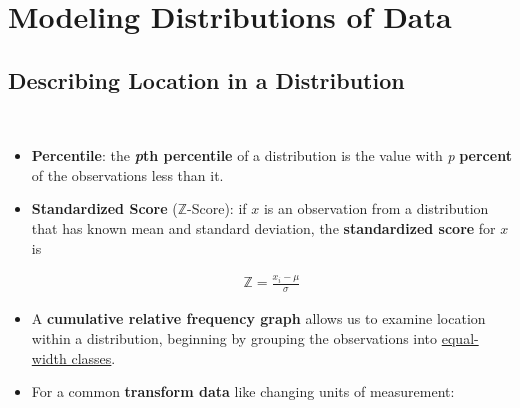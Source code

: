 \documentclass[Main.tex]{subfiles}
\begin{document}
	
	\chapter{Modeling Distributions of Data}
	
	
	\section{Describing Location in a Distribution}
	
	\begin{example} \hfill \\
			
		\begin{itemize}
			\item \textbf{Percentile}: the \textbf{{\emph{p}th percentile}} of a distribution is the value with \emph{p} \textbf{percent} of the observations less than it.\\
								
			\item \textbf{Standardized Score} ($\mathbb{Z}$-Score): if $x$ is an observation from a distribution that has known mean and standard deviation, the \textbf{standardized score} for $x$ is 
				
				\begin{definition}				
				\begin{subequations}
					\begin{align}
					\mathbb{Z}=\frac{x_{i}-\mu}{\sigma}
					\end{align}
				\end{subequations}
				\end{definition}\hfill 
			
			\item A \textbf{cumulative relative frequency graph} allows us to examine location within a distribution, beginning by grouping the observations into \underline{equal-width classes}. \\
			
			\item For a common \textbf{transform data} like changing units of measurement:
		\end{itemize}
					

\end{example}
\end{document}
